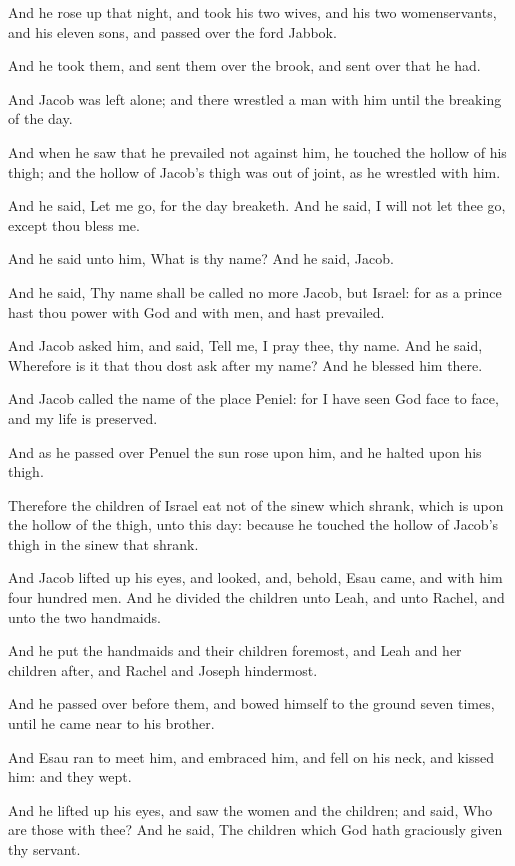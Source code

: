 \Verse And he rose up that night, and took his two wives, and his two womenservants, and his eleven sons, and passed over the ford Jabbok.

\Verse And he took them, and sent them over the brook, and sent over that he had.

\Verse And Jacob was left alone; and there wrestled a man with him until the breaking of the day.

\Verse And when he saw that he prevailed not against him, he touched the hollow of his thigh; and the hollow of Jacob's thigh was out of joint, as he wrestled with him.

\Verse And he said, Let me go, for the day breaketh. And he said, I will not let thee go, except thou bless me.

\Verse And he said unto him, What is thy name? And he said, Jacob.

\Verse And he said, Thy name shall be called no more Jacob, but Israel: for as a prince hast thou power with God and with men, and hast prevailed.

\Verse And Jacob asked him, and said, Tell me, I pray thee, thy name.  And he said, Wherefore is it that thou dost ask after my name? And he blessed him there.

\Verse And Jacob called the name of the place Peniel: for I have seen God face to face, and my life is preserved.

\Verse And as he passed over Penuel the sun rose upon him, and he halted upon his thigh.

\Verse Therefore the children of Israel eat not of the sinew which shrank, which is upon the hollow of the thigh, unto this day: because he touched the hollow of Jacob's thigh in the sinew that shrank.

\Chapter
\Verse And Jacob lifted up his eyes, and looked, and, behold, Esau came, and with him four hundred men. And he divided the children unto Leah, and unto Rachel, and unto the two handmaids.

\Verse And he put the handmaids and their children foremost, and Leah and her children after, and Rachel and Joseph hindermost.

\Verse And he passed over before them, and bowed himself to the ground seven times, until he came near to his brother.

\Verse And Esau ran to meet him, and embraced him, and fell on his neck, and kissed him: and they wept.

\Verse And he lifted up his eyes, and saw the women and the children; and said, Who are those with thee? And he said, The children which God hath graciously given thy servant.

